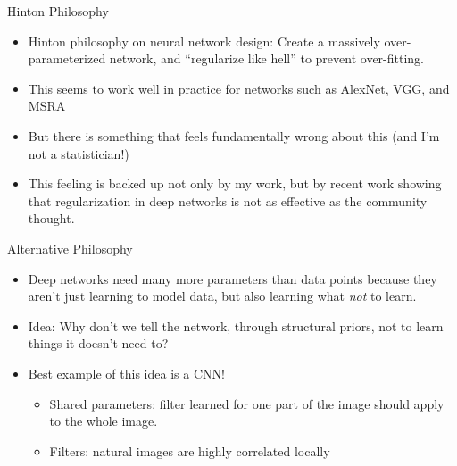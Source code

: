 \documentclass[t,xcolor=dvipsnames]{beamer}
\begin{document}
\begin{frame}{Hinton Philosophy}
\begin{itemize}
    \item Hinton philosophy on neural network design: Create a massively over-parameterized network, and ``regularize like hell'' to prevent over-fitting.
    \item This seems to work well in practice for networks such as AlexNet, VGG, and MSRA
    \item But there is something that feels fundamentally wrong about this (and I'm not a statistician!)
    \item This feeling is backed up not only by my work, but by recent work showing that regularization in deep networks is not as effective as the community thought.
\end{itemize}
\end{frame}

\begin{frame}{Alternative Philosophy}
\begin{itemize}
    \item Deep networks need many more parameters than data points because they aren't just learning to model data, but also learning what \emph{not} to learn. 
    \item Idea: Why don't we tell the network, through structural priors, not to learn things it doesn't need to?
    \item Best example of this idea is a CNN!
    \begin{itemize}
        \item Shared parameters: filter learned for one part of the image should apply to the whole image.
        \item Filters: natural images are highly correlated locally
    \end{itemize}
\end{itemize}
\end{frame}
\end{document}
